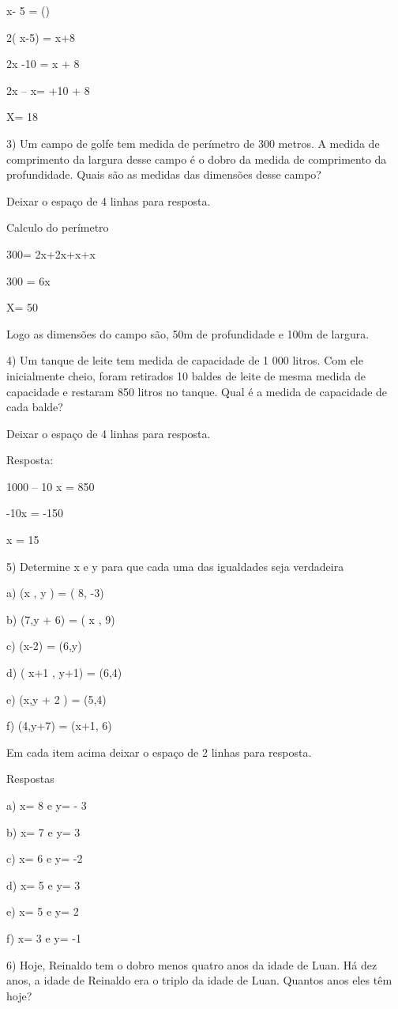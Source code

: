 x- 5 = ()

2( x-5) = x+8

2x -10 = x + 8

2x -- x= +10 + 8

X= 18

3) Um campo de golfe tem medida de perímetro de 300 metros. A medida de
comprimento da largura desse campo é o dobro da medida de comprimento da
profundidade. Quais são as medidas das dimensões desse campo?

Deixar o espaço de 4 linhas para resposta.

Calculo do perímetro

300= 2x+2x+x+x

300 = 6x

X= 50

Logo as dimensões do campo são, 50m de profundidade e 100m de largura.

4) Um tanque de leite tem medida de capacidade de 1 000 litros. Com ele
inicialmente cheio, foram retirados 10 baldes de leite de mesma medida
de capacidade e restaram 850 litros no tanque. Qual é a medida de
capacidade de cada balde?

Deixar o espaço de 4 linhas para resposta.

Resposta:

1000 -- 10 x = 850

-10x = -150

x = 15

5) Determine x e y para que cada uma das igualdades seja verdadeira

a) (x , y ) = ( 8, -3)

b) (7,y + 6) = ( x , 9)

c) (x-2) = (6,y)

d) ( x+1 , y+1) = (6,4)

e) (x,y + 2 ) = (5,4)

f) (4,y+7) = (x+1, 6)

Em cada item acima deixar o espaço de 2 linhas para resposta.

Respostas

a) x= 8 e y= - 3

b) x= 7 e y= 3

c) x= 6 e y= -2

d) x= 5 e y= 3

e) x= 5 e y= 2

f) x= 3 e y= -1

6) Hoje, Reinaldo tem o dobro menos quatro anos da idade de Luan. Há dez
anos, a idade de Reinaldo era o triplo da idade de Luan. Quantos anos
eles têm hoje?


